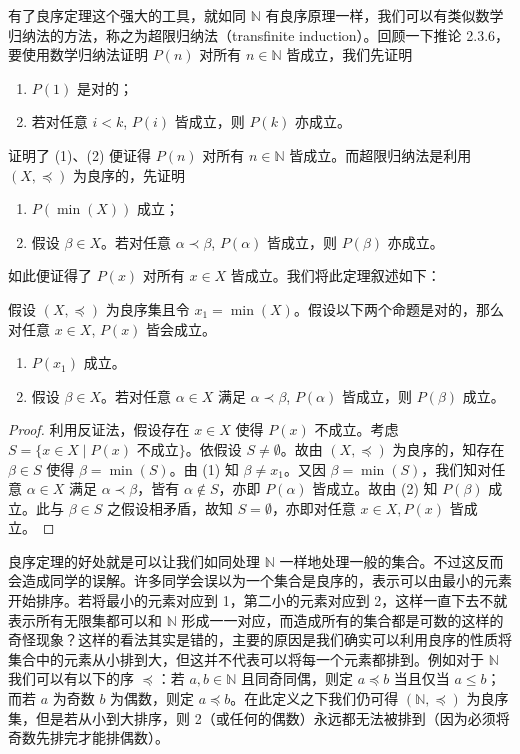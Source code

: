 有了良序定理这个强大的工具，就如同 $\mathbb{N}$ 有良序原理一样，我们可以有类似数学归纳法的方法，称之为超限归纳法（transfinite induction）。回顾一下推论 2.3.6，要使用数学归纳法证明 $P(n)$ 对所有 $n \in \mathbb{N}$ 皆成立，我们先证明
\begin{enumerate}
    \item $P(1)$ 是对的；
    \item 若对任意 $i < k$, $P(i)$ 皆成立，则 $P(k)$ 亦成立。
\end{enumerate}
证明了 (1)、(2) 便证得 $P(n)$ 对所有 $n \in \mathbb{N}$ 皆成立。而超限归纳法是利用 $(X, \preceq)$ 为良序的，先证明
\begin{enumerate}
    \item $P(\min(X))$ 成立；
    \item 假设 $\beta \in X$。若对任意 $\alpha \prec \beta$, $P(\alpha)$ 皆成立，则 $P(\beta)$ 亦成立。
\end{enumerate}
如此便证得了 $P(x)$ 对所有 $x \in X$ 皆成立。我们将此定理叙述如下：

\begin{theorem}[超限归纳法]
假设 $(X, \preceq)$ 为良序集且令 $x_1 = \min(X)$。假设以下两个命题是对的，那么对任意 $x \in X$, $P(x)$ 皆会成立。
\begin{enumerate}
    \item $P(x_1)$ 成立。
    \item 假设 $\beta \in X$。若对任意 $\alpha \in X$ 满足 $\alpha \prec \beta$, $P(\alpha)$ 皆成立，则 $P(\beta)$ 成立。
\end{enumerate}
\end{theorem}

\begin{proof}
利用反证法，假设存在 $x \in X$ 使得 $P(x)$ 不成立。考虑 $S = \{x \in X \mid P(x) \text{ 不成立}\}$。依假设 $S \neq \emptyset$。故由 $(X, \preceq)$ 为良序的，知存在 $\beta \in S$ 使得 $\beta = \min(S)$。由 (1) 知 $\beta \neq x_1$。又因 $\beta = \min(S)$，我们知对任意 $\alpha \in X$ 满足 $\alpha \prec \beta$，皆有 $\alpha \notin S$，亦即 $P(\alpha)$ 皆成立。故由 (2) 知 $P(\beta)$ 成立。此与 $\beta \in S$ 之假设相矛盾，故知 $S = \emptyset$，亦即对任意 $x \in X, P(x)$ 皆成立。
\end{proof}

良序定理的好处就是可以让我们如同处理 $\mathbb{N}$ 一样地处理一般的集合。不过这反而会造成同学的误解。许多同学会误以为一个集合是良序的，表示可以由最小的元素开始排序。若将最小的元素对应到 1，第二小的元素对应到 2，这样一直下去不就表示所有无限集都可以和 $\mathbb{N}$ 形成一一对应，而造成所有的集合都是可数的这样的奇怪现象？这样的看法其实是错的，主要的原因是我们确实可以利用良序的性质将集合中的元素从小排到大，但这并不代表可以将每一个元素都排到。例如对于 $\mathbb{N}$ 我们可以有以下的序 $\preceq$：若 $a, b \in \mathbb{N}$ 且同奇同偶，则定 $a \preceq b$ 当且仅当 $a \leq b$；而若 $a$ 为奇数 $b$ 为偶数，则定 $a \preceq b$。在此定义之下我们仍可得 $(\mathbb{N}, \preceq)$ 为良序集，但是若从小到大排序，则 2（或任何的偶数）永远都无法被排到（因为必须将奇数先排完才能排偶数）。

